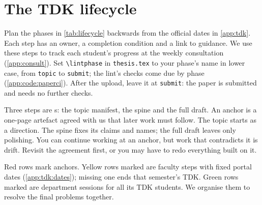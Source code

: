 \chapter{The TDK lifecycle}\label{app:lifecycle}
Plan the phases in \cref{tab:lifecycle} backwards from the official dates in \cref{app:tdk}. Each step has an owner, a completion condition and a link to guidance.
We use these steps to track each student's progress at the weekly consultation (\cref{app:consult}).
Set \texttt{\textbackslash lintphase} in \texttt{thesis.tex} to your phase's name in lower case, from \texttt{topic} to \texttt{submit}; the lint's checks come due by phase (\cref{app:code:paperci}). After the upload, leave it at \texttt{submit}: the paper is submitted and needs no further checks.

Three steps are \anchor{}s: the topic manifest, the spine and the full draft. An anchor is a one-page artefact agreed with us that later work must follow. The topic starts as a direction. The spine fixes its claims and names; the full draft leaves only polishing. You can continue working at an anchor, but work that contradicts it is drift. Revisit the agreement first, or you may have to redo everything built on it.

Red rows mark anchors. Yellow rows marked \official{} are faculty steps with fixed portal dates (\cref{app:tdk:dates}); missing one ends that semester's TDK. Green rows marked \department{} are department sessions for all its TDK students. We organise them to resolve the final problems together.

